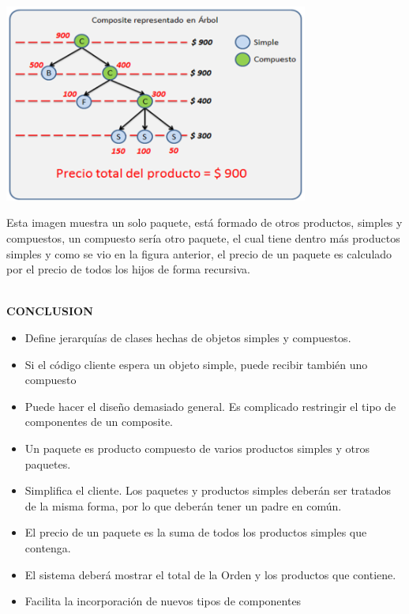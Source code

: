 \begin{flushleft}
\begin{center}
	\includegraphics[width=10cm]{./Imagenes/composite4} 
	\end{center}

Esta imagen muestra un solo paquete, está formado de otros productos, simples y compuestos, un compuesto sería otro paquete, el cual tiene dentro más productos simples y como se vio en la figura anterior, el precio de un paquete es calculado por el precio de todos los hijos de forma recursiva.

\textbf{}\\ 
\textbf{CONCLUSION}\\ 

\begin{itemize}
\item Define jerarquías de clases hechas de objetos simples y compuestos. 
\item Si el código cliente espera un objeto simple, puede recibir también uno compuesto 
\item Puede hacer el diseño demasiado general. Es complicado restringir el tipo de componentes de un composite.
\item Un paquete es producto compuesto de varios productos simples y otros paquetes.
\item Simplifica el cliente.  Los paquetes y productos simples deberán ser tratados de la misma forma, por lo que deberán tener un padre en común.
\item El precio de un paquete es la suma de todos los productos simples que contenga.
\item El sistema deberá mostrar el total de la Orden y los productos que contiene.
\item Facilita la incorporación de nuevos tipos de componentes


\end{itemize} 





\end{flushleft}